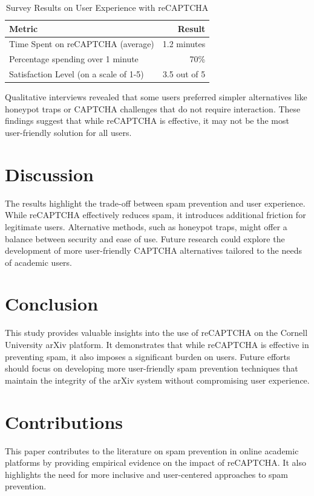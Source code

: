 \documentclass{article}
\begin{document}
\begin{table}[htbp]
    \centering
    \caption{Survey Results on User Experience with reCAPTCHA}
    \label{tab:survey_results}
    \begin{tabular}{l r}
        \toprule
        Metric & Result \\
        \midrule
        Time Spent on reCAPTCHA (average) & 1.2 minutes \\
        Percentage spending over 1 minute & 70\% \\
        Satisfaction Level (on a scale of 1-5) & 3.5 out of 5 \\
        \bottomrule
    \end{tabular}
\end{table}

Qualitative interviews revealed that some users preferred simpler alternatives like honeypot traps or CAPTCHA challenges that do not require interaction. These findings suggest that while reCAPTCHA is effective, it may not be the most user-friendly solution for all users.

\section{Discussion}
The results highlight the trade-off between spam prevention and user experience. While reCAPTCHA effectively reduces spam, it introduces additional friction for legitimate users. Alternative methods, such as honeypot traps, might offer a balance between security and ease of use. Future research could explore the development of more user-friendly CAPTCHA alternatives tailored to the needs of academic users.

\section{Conclusion}
This study provides valuable insights into the use of reCAPTCHA on the Cornell University arXiv platform. It demonstrates that while reCAPTCHA is effective in preventing spam, it also imposes a significant burden on users. Future efforts should focus on developing more user-friendly spam prevention techniques that maintain the integrity of the arXiv system without compromising user experience.

\section{Contributions}
This paper contributes to the literature on spam prevention in online academic platforms by providing empirical evidence on the impact of reCAPTCHA. It also highlights the need for more inclusive and user-centered approaches to spam prevention.
\end{document}
